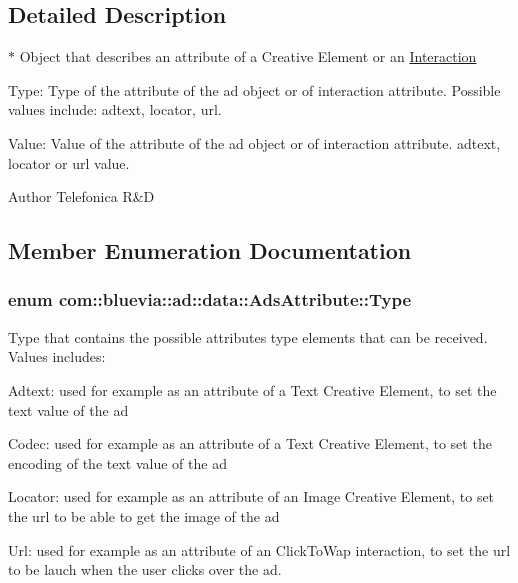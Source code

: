 \subsection{Detailed Description}
$\ast$ Object that describes an attribute of a Creative Element or an \hyperlink{classcom_1_1bluevia_1_1ad_1_1data_1_1Interaction}{Interaction} 
\begin{DoxyItemize}
\item Type: Type of the attribute of the ad object or of interaction attribute. Possible values include: adtext, locator, url. 
\item Value: Value of the attribute of the ad object or of interaction attribute. adtext, locator or url value. 
\end{DoxyItemize}

\begin{DoxyAuthor}{Author}
Telefonica R\&D 
\end{DoxyAuthor}


\subsection{Member Enumeration Documentation}
\hypertarget{classcom_1_1bluevia_1_1ad_1_1data_1_1AdsAttribute_a91897d047ee70ae0e123b6adc73973cc}{
\subsubsection[{Type}]{\setlength{\rightskip}{0pt plus 5cm}enum {\bf com::bluevia::ad::data::AdsAttribute::Type}}}
\label{classcom_1_1bluevia_1_1ad_1_1data_1_1AdsAttribute_a91897d047ee70ae0e123b6adc73973cc}
Type that contains the possible attributes type elements that can be received. Values includes: 
\begin{DoxyItemize}
\item Adtext: used for example as an attribute of a Text Creative Element, to set the text value of the ad 
\item Codec: used for example as an attribute of a Text Creative Element, to set the encoding of the text value of the ad 
\item Locator: used for example as an attribute of an Image Creative Element, to set the url to be able to get the image of the ad 
\item Url: used for example as an attribute of an ClickToWap interaction, to set the url to be lauch when the user clicks over the ad. 
\end{DoxyItemize}

